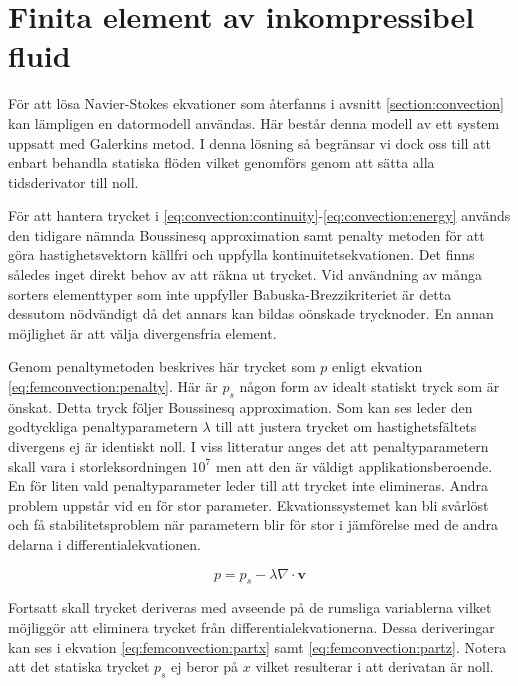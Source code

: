 \section{Finita element av inkompressibel fluid}
\label{sec:femconvection}
För att lösa Navier-Stokes ekvationer som återfanns i avsnitt
\ref{section:convection} kan lämpligen en datormodell användas.
Här består denna modell av ett system uppsatt med Galerkins metod.
I denna lösning så begränsar vi dock oss till att enbart behandla statiska flöden
vilket genomförs genom att sätta alla tidsderivator till noll.

För att hantera trycket i \eqref{eq:convection:continuity}-\eqref{eq:convection:energy} används den tidigare nämnda Boussinesq approximation
samt penalty metoden för att göra hastighetsvektorn källfri och uppfylla
kontinuitetsekvationen. Det finns således inget direkt behov av att räkna ut trycket.
Vid användning av många sorters elementtyper som inte uppfyller Babuska-Brezzikriteriet
är detta dessutom nödvändigt då det annars kan bildas oönskade trycknoder. 
En annan möjlighet är att välja divergensfria element. \cite{babuska1973}\cite{segal2011}

Genom penaltymetoden beskrives här trycket som $p$ enligt ekvation
\eqref{eq:femconvection:penalty}. Här är $p_s$ någon form av idealt statiskt
tryck som är önskat. Detta tryck följer Boussinesq approximation.
\cite{heinrich88}\cite{taylor79}
Som kan ses leder den godtyckliga penaltyparametern $\lambda$ till att justera trycket
om hastighetsfältets divergens ej är identiskt noll. I viss litteratur anges 
det att penaltyparametern skall vara i storleksordningen $10^7$ men att den
är väldigt applikationsberoende. En för liten vald penaltyparameter leder till att
trycket inte elimineras. Andra problem uppstår vid en för stor parameter. Ekvationssystemet
kan bli svårlöst och få stabilitetsproblem när parametern blir
för stor i jämförelse med de andra delarna i differentialekvationen.\cite{reddy93}\cite{roy05}\cite{basak04}\cite{segal2011}

\begin{equation}
\label{eq:femconvection:penalty}
p = p_s - \lambda\nabla\cdot\mathbf{v}
\end{equation}

\noindent
Fortsatt skall trycket deriveras med avseende på de rumsliga variablerna vilket möjliggör
att eliminera trycket från differentialekvationerna. Dessa deriveringar kan ses i ekvation
\eqref{eq:femconvection:partx} samt \eqref{eq:femconvection:partz}.
Notera att det statiska trycket
$p_s$ ej beror på $x$ vilket resulterar i att derivatan är noll.

